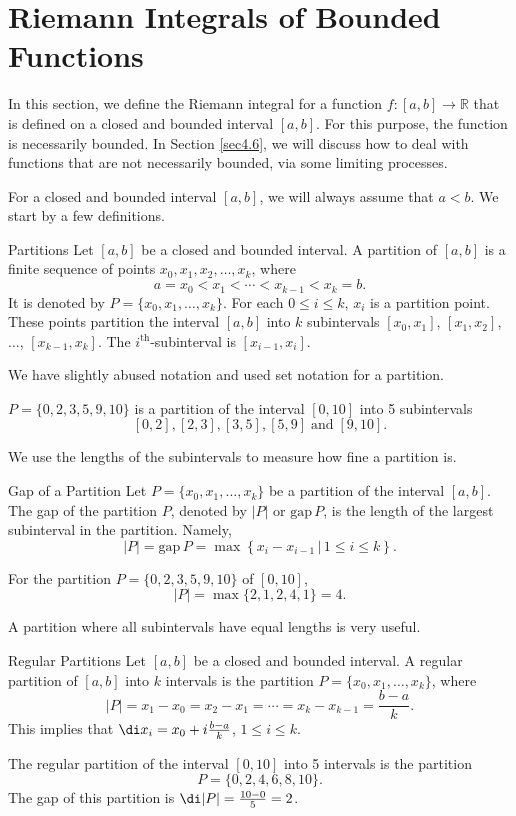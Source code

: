 \section{Riemann Integrals of Bounded Functions }\label{sec4.1}

In this section, we  define the Riemann integral for a function $f:[a,b]\to\mathbb{R}$ that is defined on a closed and bounded interval $[a,b]$. For this purpose, the function is necessarily bounded. In Section \ref{sec4.6}, we will discuss how to deal with functions that are not necessarily bounded, via some limiting processes. 

For  a closed and bounded interval $[a,b]$, we will always assume that $a<b$.
We start by a few definitions.
\begin{definition}{Partitions}
Let $[a, b]$ be a closed and bounded interval. A partition of $[a,b]$ is a finite sequence of points $x_0, x_1, x_2, \ldots, x_k$, where
\[a=x_0<x_1<\cdots<x_{k-1}<x_k=b.\]
 It is denoted by $P=\{x_0, x_1, \ldots, x_k\}$. For each $0\leq i\leq k$, $x_i$ is a partition point. These points partition the interval $[a, b]$ into $k$ subintervals $[x_0, x_1]$, $[x_1, x_2]$, $\ldots$, $[x_{k-1}, x_k]$. The $i^{\text{th}}$-subinterval is $[x_{i-1}, x_i]$.
\end{definition}We have slightly abused notation and used set notation for a partition.  
\begin{example}{}
$P=\{0, 2, 3, 5, 9, 10\}$ is a partition of the interval $[0,10]$ into 5 subintervals 
\[[0, 2], [2, 3], [3, 5], [5, 9]\;\text{and}\;[9,10].\]
\end{example}
We use the lengths of the subintervals to measure how fine a partition is. 
\begin{definition}{Gap of a Partition}
Let $P=\{x_0, x_1, \ldots, x_k\}$ be a partition of the interval $[a,b]$. The gap of the partition $P$, denoted by $|P|$ or $\text{gap}\,P$, is the length of the largest subinterval in the partition. Namely,
\[|P|=\text{gap}\, P=\max\left\{x_i-x_{i-1}\,|\, 1\leq i\leq k\right\}.\]
\end{definition}
\begin{example}{}For the partition $P=\{0, 2, 3, 5, 9, 10\}$ of $[0, 10]$,
\[|P|=\max\{2,1,2,4,1\}=4.\]
\end{example}
A partition where all subintervals have equal lengths is very useful.
\begin{definition}{Regular Partitions}
Let $[a, b]$ be a closed and bounded interval. A regular partition of $[a,b]$ into $k$ intervals is the partition 
$P=\{x_0, x_1, \ldots, x_k\}$, where 
\[|P|=x_1-x_0=x_2-x_1=\cdots=x_k-x_{k-1}=\frac{b-a}{k}.\]This implies that
$\di x_i=x_0+i\frac{b-a}{k}$, $1\leq i\leq k$.

\end{definition}
 \begin{example}{}
The  regular partition of the interval $[0,10]$ into 5 intervals is the partition 
\[P=\{0, 2, 4, 6, 8, 10\}.\]The gap of this partition is
$\di |P|=\frac{10-0}{5}=2$.
\end{example}

